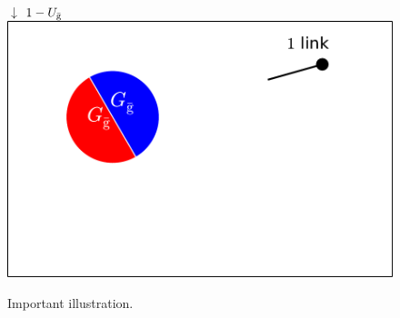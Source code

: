 \documentclass[aps, pre, onecolumn, a4paper, floatfix]{revtex4}
\begin{document}
\begin{figure}[htb]
\begin{minipage}[b]{0.3\linewidth}
\begin{center}
    {\huge $\downarrow$} $1-U_{\bar{\rm g}}$\\
    \includegraphics[width=0.99\columnwidth]{sets_1_gc_no_2.pdf}\\
   \end{center}
  \end{minipage}
    \caption{Important illustration.}
    \label{fig:1}
\end{figure}
\end{document}
